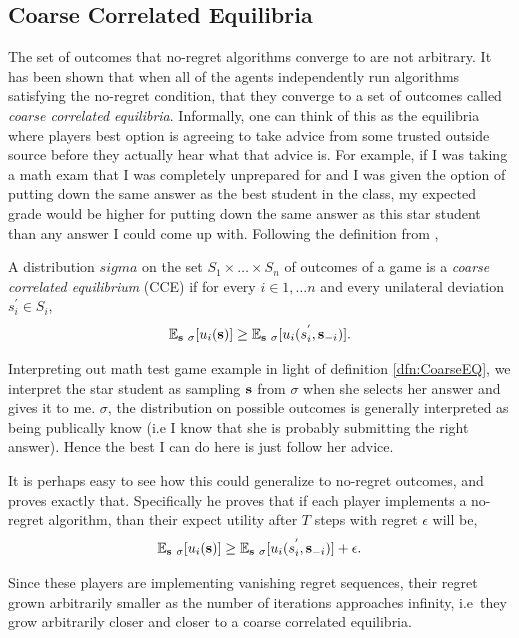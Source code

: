 \documentclass[12pt,twoside]{reedthesis}
\begin{document}
\subsection{Coarse Correlated Equilibria}
The set of outcomes that no-regret algorithms converge to are not arbitrary. It has been shown that when all of the agents independently run algorithms satisfying the no-regret condition, that they converge to a set of outcomes called {\em coarse correlated equilibria}. Informally, one can think of this as the equilibria where players best option is agreeing to take advice from some trusted outside source before they actually hear what that advice is. For example, if I was taking a math exam that I was completely unprepared for and I was given the option of putting down the same answer as the best student in the class, my expected grade would be higher for putting down the same answer as this star student than any answer I could come up with. Following the definition from \cite{Roughgarden2016},

\begin{dfn}
	A distribution $sigma$ on the set $S_1 \times \ldots \times S_n$ of outcomes of a game is a {\em coarse correlated equilibrium} (CCE) if for every $i \in {1, \ldots n}$ and every unilateral deviation $s_i^{'} \in S_i$,
	$$\mathbb{E}_{\textbf{s} ~ \sigma}[u_i(\textbf{s})] \geq \mathbb{E}_{\textbf{s} ~ \sigma}[u_i(s_i^{'}, \textbf{s}_{-i})].$$
	\label{dfn:CoarseEQ}
\end{dfn}

Interpreting out math test game example in light of definition \ref{dfn:CoarseEQ}, we interpret the star student as sampling $\textbf{s}$ from $\sigma$ when she selects her answer and gives it to me. $\sigma$, the distribution on possible outcomes is generally interpreted as being publically know (i.e I know that she is probably submitting the right answer). Hence the best I can do here is just follow her advice.

It is perhaps easy to see how this could generalize to no-regret outcomes, and \cite{Roughgarden2016} proves exactly that. Specifically he proves that if each player implements a no-regret algorithm, than their expect utility after $T$ steps with regret $\epsilon$ will be,
$$ \mathbb{E}_{\textbf{s} ~ \sigma}[u_i(\textbf{s})] \geq \mathbb{E}_{\textbf{s} ~ \sigma}[u_i(s_i^{'}, \textbf{s}_{-i})] + \epsilon.$$

Since these players are implementing vanishing regret sequences, their regret grown arbitrarily smaller as the number of iterations approaches infinity, i.e~they grow arbitrarily closer and closer to a coarse correlated equilibria.
\end{document}
